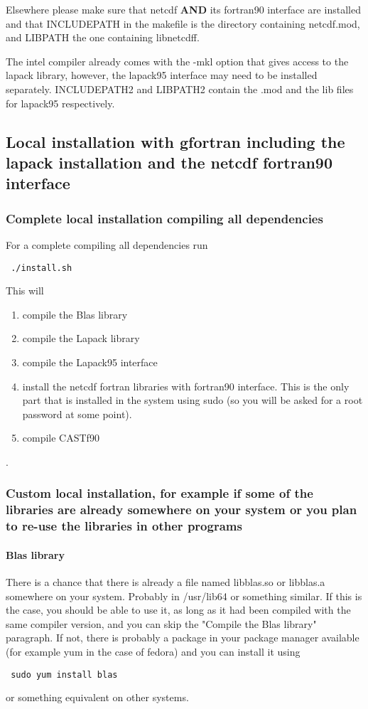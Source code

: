 \documentclass[11p,a4paper]{article}
\begin{document}
Elsewhere please make sure that netcdf \textbf{AND} its fortran90 interface are installed and that INCLUDEPATH in the makefile is the directory containing netcdf.mod, and LIBPATH the one containing libnetcdff. 

The intel compiler already comes with the -mkl option that gives access to the lapack library, however, the lapack95 interface may need to be installed separately. INCLUDEPATH2 and LIBPATH2 contain the .mod and the lib files for lapack95 respectively. 


\subsection{Local installation with gfortran including the lapack installation and the netcdf fortran90 interface}
\subsubsection{Complete local installation compiling all dependencies}
For a complete compiling all dependencies run
\begin{verbatim}
 ./install.sh
\end{verbatim}
This will 
\begin{enumerate}
 \item compile the Blas library
 \item compile the Lapack library
 \item compile the Lapack95 interface
 \item install the netcdf fortran libraries with fortran90 interface. This is the only part that is installed in the system using sudo (so you will be asked for a root password at some point).
 \item compile CASTf90
\end{enumerate}.
\subsubsection{Custom local installation, for example if some of the libraries are already somewhere on your system or you plan to re-use the libraries in other programs}
\paragraph{Blas library}
There is a chance that there is already a file named libblas.so or libblas.a somewhere on your system. Probably in /usr/lib64 or something similar. If this is the case, you should be able to use it, as long as it had been compiled with the same compiler version, and you can skip the "Compile the Blas library" paragraph. If not, there is probably a package in your package manager available (for example yum in the case of fedora) and you can install it using
\begin{verbatim}
 sudo yum install blas
\end{verbatim}
or something equivalent on other systems.
\end{document}
